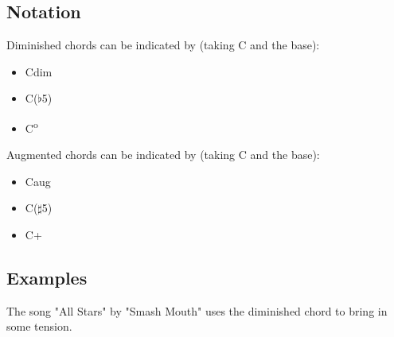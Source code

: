 \subsection{Notation}
\begin{minipage}{0.4\textwidth}
	Diminished chords can be indicated by (taking C and the base):
	
	\begin{itemize}
		\item Cdim
		\item C($\flat$5)
		\item C\textsuperscript{o}
	\end{itemize}
\end{minipage}
\hfill
\begin{minipage}{0.4\textwidth}
	Augmented chords can be indicated by (taking C and the base):
	
	\begin{itemize}
		\item Caug
		\item C($\sharp$5)
		\item C+
	\end{itemize}
\end{minipage}

\newpage

\subsection{Examples}


The song "All Stars" by "Smash Mouth" uses the diminished chord to bring in some tension.
 
